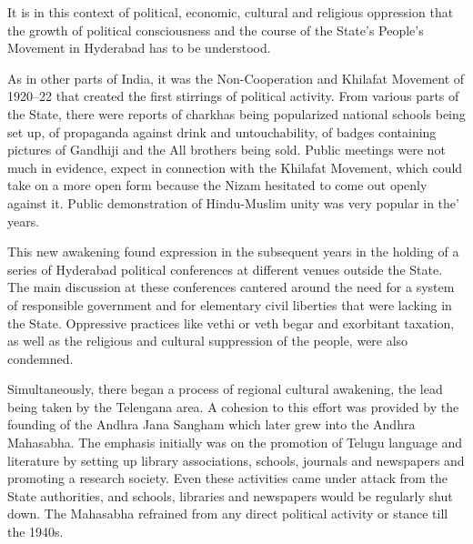 \begin{multicols}{2}
It is in this context of political, economic, cultural and religious oppression that the growth of political consciousness and the course of the State's People's Movement in Hyderabad has to be understood. 

As in other parts of India, it was the Non-Cooperation and Khilafat Movement of 1920--22 that created the first stirrings of political activity. From various parts of the State, there were reports of charkhas being popularized national schools being set up, of propaganda against drink and untouchability, of badges containing pictures of Gandhiji and the All brothers being sold. Public meetings were not much in evidence, expect in connection with the Khilafat Movement, which could take on a more open form because the Nizam hesitated to come out openly against it. Public demonstration of Hindu-Muslim unity was very popular in the' years. 

This new awakening found expression in the subsequent years in the holding of a series of Hyderabad political conferences at different venues outside the State. The main discussion at these conferences cantered around the need for a system of responsible government and for elementary civil liberties that were lacking in the State. Oppressive practices like vethi or veth begar and exorbitant taxation, as well as the religious and cultural suppression of the people, were also condemned. 

Simultaneously, there began a process of regional cultural awakening, the lead being taken by the Telengana area. A cohesion to this effort was provided by the founding of the Andhra Jana Sangham which later grew into the Andhra Mahasabha. The emphasis initially was on the promotion of Telugu language and literature by setting up library associations, schools, journals and newspapers and promoting a research society. Even these activities came under attack from the State authorities, and schools, libraries and newspapers would be regularly shut down. The Mahasabha refrained from any direct political activity or stance till the 1940s. 


\end{multicols}
